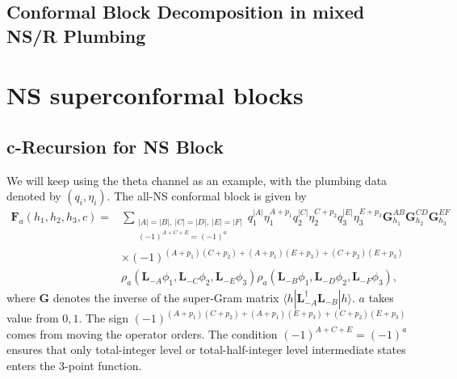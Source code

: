 \documentclass[12pt]{article}
\newcommand{\ie}{\begin{equation}\begin{aligned}}
\newcommand{\fe}{\end{aligned}\end{equation}}
\numberwithin{equation}{section}
\begin{document}
\subsection{Conformal Block Decomposition in mixed NS/R Plumbing}


\section{NS superconformal blocks}


\subsection{c-Recursion for NS Block}

We will keep using the theta channel as an example, with the plumbing data denoted by $(q_i, \eta_i)$. The all-NS conformal block is given by
\ie \label{NSblockRecursionDefinition}
\mathbf{F}_a(h_1, h_2, h_3, c)= &\sum_{\substack{
|A|=|B|,\ |C|=|D|,\ |E|=|F|\\
(-1)^{A+C+E}=(-1)^a
}}q_1^{|A|}\eta_1^{A+p_1} q_2^{|C|} \eta_2^{C+p_2} q_3^{|E|} \eta_3^{E+p_3} \mathbf{G}_{h_1}^{A B} \mathbf{G}_{h_2}^{C D} \mathbf{G}_{h_3}^{E F} \\
& \times (-1)^{(A+p_1)(C+p_2)+(A+p_1)(E+p_3)+(C+p_2)(E+p_3)} \\
&\rho_a(\mathbf{L}_{-A} \phi_1, \mathbf{L}_{-C} \phi_2, \mathbf{L}_{-E} \phi_3) \rho_a(\mathbf{L}_{-B} \phi_1, \mathbf{L}_{-D} \phi_2, \mathbf{L}_{-F} \phi_3) ,
\fe
where $\mathbf{G}$ denotes the inverse of the super-Gram matrix $\langle h|\mathbf{L}_{-A}^\dagger\mathbf{L}_{-B}|h\rangle$. $a$ takes value from $0, 1$. The sign $(-1)^{(A+p_1)(C+p_2)+(A+p_1)(E+p_3)+(C+p_2)(E+p_3)}$ comes from moving the operator orders. The condition $(-1)^{A+C+E}=(-1)^a$ ensures that only total-integer level or total-half-integer level intermediate states enters the 3-point function.
\end{document}
